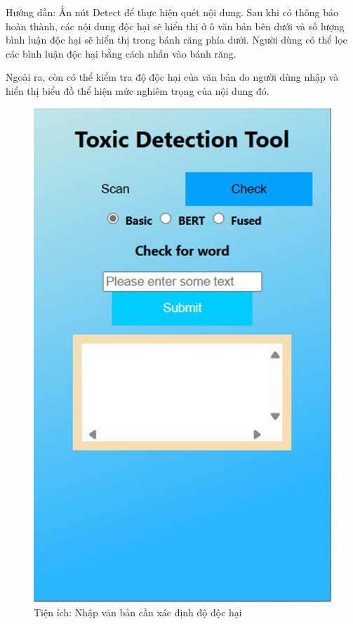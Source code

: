 Hướng dẫn: Ấn nút Detect để thực hiện quét nội dung. Sau khi có thông báo hoàn thành, các nội dung độc hại sẽ hiển thị ở ô văn bản bên dưới và số lượng bình luận độc hại sẽ hiển thị trong bánh răng phía dưới. Người dùng có thể lọc các bình luận độc hại bằng cách nhấn vào bánh răng.

Ngoài ra, còn có thể kiểm tra độ độc hại của văn bản do người dùng nhập và hiển thị biểu đồ thể hiện mức nghiêm trọng của nội dung đó.

\begin{figure}[htb]
    \centering
    \includegraphics[width=\textwidth]{image/ex_text_enter.png}
    \caption{Tiện ích: Nhập văn bản cần xác định độ độc hại}
    \label{figure:ex_text_enter}
\end{figure}

